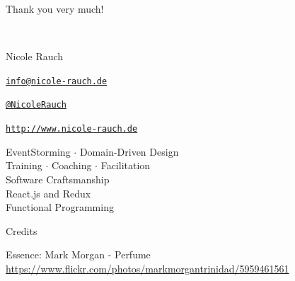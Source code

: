 \begin{frame}{Thank you very much!}

  ~\\[1em]
  \begin{block}{Nicole Rauch}
    \begin{description}[Twitterxx]
    \item[E-Mail]  \href{mailto:info@nicole-rauch.de}{\texttt{info@nicole-rauch.de}}
    \item[Twitter] \href{http://twitter.com/NicoleRauch}{\texttt{@NicoleRauch}}
    \item[Web] \href{http://www.nicole-rauch.de}{\texttt{http://www.nicole-rauch.de}}
    \end{description}
  \end{block}

\begin{center}
EventStorming $\cdot$ Domain-Driven Design \\
Training $\cdot$ Coaching $\cdot$ Facilitation \\
Software Craftsmanship \\ 
React.js and Redux  \\
Functional Programming
\end{center}  

\end{frame}


\begin{frame}{Credits}

Essence: Mark Morgan - Perfume
{\footnotesize \url{https://www.flickr.com/photos/markmorgantrinidad/5959461561}}


\end{frame}
